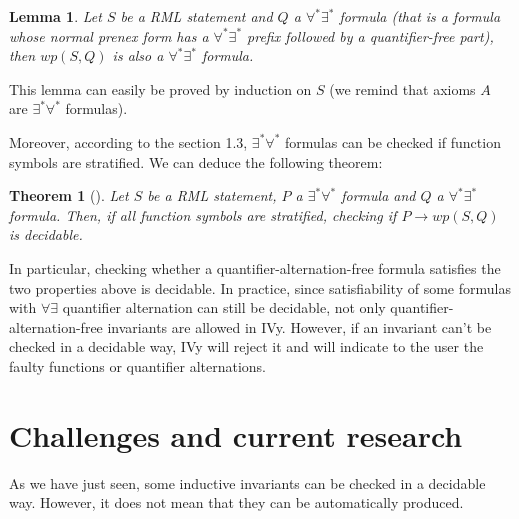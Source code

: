 \documentclass[11pt,a4paper,oldfontcommands]{memoir}
\newtheorem*{theorem}{Theorem}
\newtheorem*{lemma}{Lemma}
\begin{document}
    \begin{lemma}
        Let \(S\) be a RML statement and \(Q\) a \(\forall^*\exists^*\) formula (that is a formula whose normal prenex form has a \(\forall^*\exists^*\) prefix followed by a quantifier-free part), then \(wp(S,Q)\) is also a \(\forall^*\exists^*\) formula.
    \end{lemma}

    This lemma can easily be proved by induction on \(S\) (we remind that axioms \(A\) are \(\exists^*\forall^*\) formulas).
    
    Moreover, according to the section 1.3, \(\exists^*\forall^*\) formulas can be checked if function symbols are stratified.
    We can deduce the following theorem:

    \begin{theorem}[]
        Let \(S\) be a RML statement, \(P\) a \(\exists^*\forall^*\) formula and \(Q\) a \(\forall^*\exists^*\) formula.
        Then, if all function symbols are stratified, checking if \( P \rightarrow wp(S,Q) \) is decidable.
    \end{theorem}

    In particular, checking whether a quantifier-alternation-free formula satisfies the two properties above is decidable.
    In practice, since satisfiability of some formulas with \( \forall\exists \) quantifier alternation can still be decidable,
    not only quantifier-alternation-free invariants are allowed in IVy. However, if an invariant can't be checked in a decidable way, IVy will reject it
    and will indicate to the user the faulty functions or quantifier alternations.

    \section{Challenges and current research}

    As we have just seen, some inductive invariants can be checked in a decidable way.
    However, it does not mean that they can be automatically produced.
\end{document}

